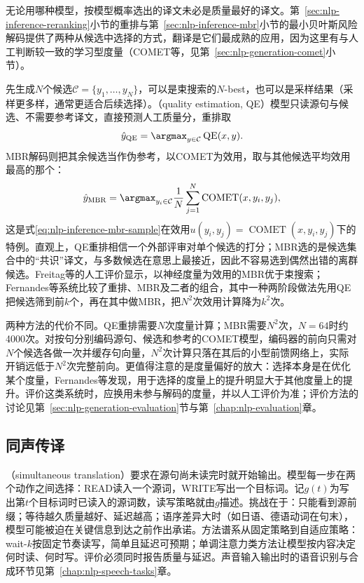 无论用哪种模型，按模型概率选出的译文未必是质量最好的译文。第~\ref{sec:nlp-inference-reranking}小节的重排与第~\ref{sec:nlp-inference-mbr}小节的最小贝叶斯风险解码提供了两种从候选中选择的方式，翻译是它们最成熟的应用，因为这里有与人工判断较一致的学习型度量（COMET等，见第~\ref{sec:nlp-generation-comet}小节）。

先生成$N$个候选$\mathcal C=\{y_1,\ldots,y_N\}$，可以是束搜索的$N$-best，也可以是采样结果（采样更多样，通常更适合后续选择）。（quality estimation, QE）模型只读源句与候选、不需要参考译文，直接预测人工质量分，重排取
\begin{equation}
  \hat y_{\mathrm{QE}}=\argmax_{y\in\mathcal C}\operatorname{QE}(x,y).
  \label{eq:nlp-generation-qe-rerank}
\end{equation}
MBR解码则把其余候选当作伪参考，以COMET为效用，取与其他候选平均效用最高的那个：
\begin{equation}
  \hat y_{\mathrm{MBR}}=\argmax_{y_i\in\mathcal C}\frac{1}{N}\sum_{j=1}^{N}\operatorname{COMET}(x,y_i,y_j),
  \label{eq:nlp-generation-comet-mbr}
\end{equation}
这是式\eqref{eq:nlp-inference-mbr-sample}在效用$u(y_i,y_j)=\operatorname{COMET}(x,y_i,y_j)$下的特例。直观上，QE重排相信一个外部评审对单个候选的打分；MBR选的是候选集合中的“共识”译文，与多数候选在意思上最接近，因此不容易选到偶然出错的离群候选。Freitag等的人工评价显示，以神经度量为效用的MBR优于束搜索\cite{nlp-inference-freitag2022mbr}；Fernandes等系统比较了重排、MBR及二者的组合，其中一种两阶段做法先用QE把候选筛到前$k$个，再在其中做MBR，把$N^2$次效用计算降为$k^2$次。

两种方法的代价不同。QE重排需要$N$次度量计算；MBR需要$N^2$次，$N=64$时约4000次。对按句分别编码源句、候选和参考的COMET模型，编码器的前向只需对$N$个候选各做一次并缓存句向量，$N^2$次计算只落在其后的小型前馈网络上，实际开销远低于$N^2$次完整前向。更值得注意的是度量偏好的放大：选择本身是在优化某个度量，Fernandes等发现，用于选择的度量上的提升明显大于其他度量上的提升。评价这类系统时，应换用未参与解码的度量，并以人工评价为准；评价方法的讨论见第~\ref{sec:nlp-generation-evaluation}节与第~\ref{chap:nlp-evaluation}章。

\subsection{同声传译}
\label{sec:nlp-generation-simultaneous}

（simultaneous translation）要求在源句尚未读完时就开始输出。模型每一步在两个动作之间选择：READ读入一个源词，WRITE写出一个目标词。记$g(t)$为写出第$t$个目标词时已读入的源词数，读写策略就由$g$描述。挑战在于：只能看到源前缀；等待越久质量越好、延迟越高；语序差异大时（如日语、德语动词在句末），模型可能被迫在关键信息到达之前作出承诺。方法谱系从固定策略到自适应策略：wait-$k$按固定节奏读写，简单且延迟可预期；单调注意力类方法让模型按内容决定何时读、何时写。评价必须同时报告质量与延迟。声音输入输出时的语音识别与合成环节见第~\ref{chap:nlp-speech-tasks}章。

